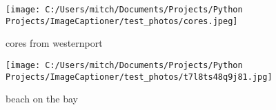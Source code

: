 \documentclass{article}%
\begin{document}
%
\normalsize%


\begin{figure}[h]%
\centering%
\texttt{[image: C:/Users/mitch/Documents/Projects/Python Projects/ImageCaptioner/test\_photos/cores.jpeg]}%
\caption{cores from westernport}%
\end{figure}

%


\begin{figure}[h]%
\centering%
\texttt{[image: C:/Users/mitch/Documents/Projects/Python Projects/ImageCaptioner/test\_photos/t7l8ts48q9j81.jpg]}%
\caption{beach on the bay}%
\end{figure}

%
\end{document}
